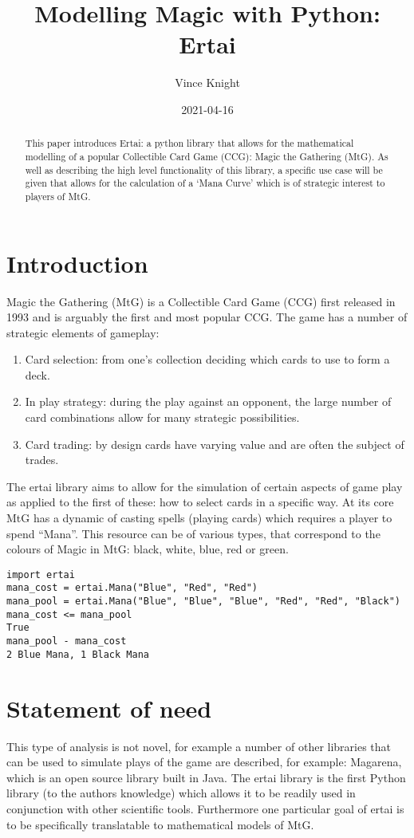 \documentclass{article}
\title{Modelling Magic with Python: Ertai}
\author{Vince Knight}
\date{2021-04-16}
\begin{document}
\maketitle

\begin{abstract}
This paper introduces Ertai: a python library that allows for the mathematical modelling of a popular Collectible Card Game (CCG): Magic the Gathering (MtG). As well as describing the high level functionality of this library, a specific use case will be given that allows for the calculation of a ‘Mana Curve’ which is of strategic interest to players of MtG.
\end{abstract}

\section{Introduction}
Magic the Gathering (MtG) is a Collectible Card Game (CCG) first released in 1993 and is arguably the first and most popular CCG. The game has a number of strategic elements of gameplay:
\begin{enumerate}
    \item Card selection: from one's collection deciding which cards to use to form a deck.
    \item In play strategy: during the play against an opponent, the large number of card combinations allow for many strategic possibilities.
    \item Card trading: by design cards have varying value and are often the subject of trades.
\end{enumerate}
The ertai library aims to allow for the simulation of certain aspects of game play as applied to the first of these: how to select cards in a specific way. At its core MtG has a dynamic of casting spells (playing cards) which requires a player to spend “Mana”. This resource can be of various types, that correspond to the colours of Magic in MtG: black, white, blue, red or green. 

\begin{verbatim}
import ertai
mana_cost = ertai.Mana("Blue", "Red", "Red")
mana_pool = ertai.Mana("Blue", "Blue", "Blue", "Red", "Red", "Black")
mana_cost <= mana_pool
True
mana_pool - mana_cost
2 Blue Mana, 1 Black Mana
\end{verbatim}

\section{Statement of need}
This type of analysis is not novel, for example a number of other libraries that can be used to simulate plays of the game are described, for example: Magarena, which is an open source library built in Java. The ertai library is the first Python library (to the authors knowledge) which allows it to be readily used in conjunction with other scientific tools. Furthermore one particular goal of ertai is to be specifically translatable to mathematical models of MtG.
\end{document}

